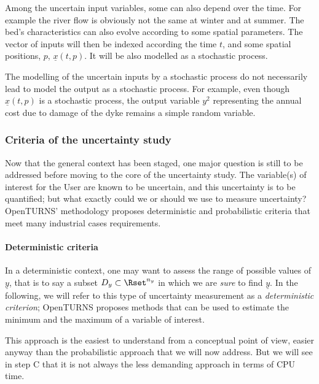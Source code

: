 Among the uncertain input variables, some can also depend over the time. For example the river flow is obviously not the same at winter and at summer.
The bed's characteristics can also evolve according to some spatial parameters. The vector of inputs will then be indexed according the time $t$, and some spatial positions, $p$,
$\underline{x}(t,p)$. It will be also modelled as a stochastic process.

The modelling of the uncertain inputs by a stochastic process do not necessarily lead to model the output as a stochastic process. For example, even though $\underline{x}(t,p)$ is a stochastic process, the output variable $y^2$ representing the annual cost due to damage of the dyke remains a simple random variable.

\subsubsection{Criteria of the uncertainty study}

Now that the general context has been staged, one major question is still to be addressed before moving to the core of the uncertainty study. The variable(s) of interest for the User are known to be uncertain, and this uncertainty is to be quantified; but what exactly could we or should we use to measure uncertainty? OpenTURNS' methodology proposes deterministic and probabilistic criteria that meet many industrial cases requirements.



\paragraph{Deterministic criteria}
\par

In a deterministic context, one may want to assess the range of possible values of $\underline{y}$, that is to say a subset $D_y \subset \Rset^{n_y}$ in which we are {\em sure} to find $\underline{y}$. In the following, we will refer to this type of uncertainty measurement as a {\em deterministic criterion}; OpenTURNS proposes methods that can be used to estimate the minimum and the maximum of a variable of interest.

This approach is the easiest to understand from a conceptual point of view, easier anyway than the probabilistic approach that we will now address. But we will see in step C that it is not always the less demanding approach in terms of CPU time.

